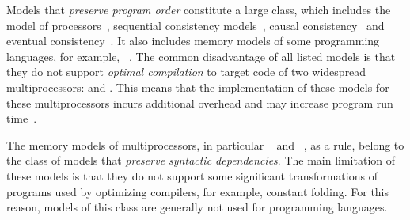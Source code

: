 Models that \emph{preserve program order} constitute a large class, which includes the \TSO model of \Intel processors~\autocite{Sewell-al:CACM10}, sequential consistency models~\autocite{Lamport:TC79}, causal consistency~\autocite{Lahav-Boker:PLDI2020} and eventual consistency~\autocite{Jagadeesan-al:ESOP2018}.
It also includes memory models of some programming languages, for example, \OCaml~\autocite{Dolan-al:PLDI18}.
The common disadvantage of all listed models is that they do not support \emph{optimal compilation} to target code of two widespread multiprocessors: \ARM and \POWER.
This means that the implementation of these models for these multiprocessors incurs additional overhead and may increase program run time~\autocite{Ou-Demsky:OOPSLA18}.

The memory models of multiprocessors, in particular \ARM~\autocite{Pulte-al:POPL18} and \POWER~\autocite{Sarkar-al:PLDI11}, as a rule, belong to the class of models that \emph{ preserve syntactic dependencies}.
The main limitation of these models is that they do not support some significant transformations of programs used by optimizing compilers, for example, constant folding.
For this reason, models of this class are generally not used for programming languages.

